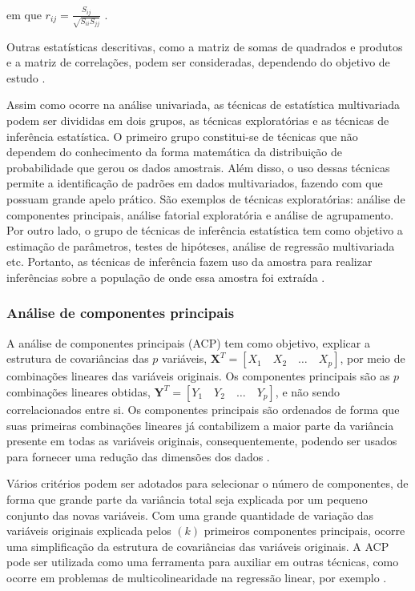 \documentclass[12pt,a4paper]{article}
\begin{document}
\noindent em que $r_{ij} = \frac{S_{ij}}{\sqrt{S_{ii} S_{jj}}}$ \cite{ferreira11}.  
	
\vspace{0.15cm} %
	
Outras estatísticas descritivas, como a matriz de somas de quadrados e produtos e a matriz de correlações, podem ser consideradas, dependendo do objetivo de estudo \cite{ferreira11}.
	
Assim como ocorre na análise univariada, as técnicas de estatística multivariada podem ser divididas em dois grupos, as técnicas exploratórias e as técnicas de inferência estatística. O primeiro grupo constitui-se de técnicas que não dependem do conhecimento da forma matemática da distribuição de probabilidade que gerou os dados amostrais. Além disso, o uso dessas técnicas permite a identificação de padrões em dados multivariados, fazendo com que possuam grande apelo prático. São exemplos de técnicas exploratórias: análise de componentes principais, análise fatorial exploratória e análise de agrupamento. Por outro lado, o grupo de técnicas de inferência estatística tem como objetivo a estimação de parâmetros, testes de hipóteses, análise de regressão multivariada etc.  Portanto, as técnicas de inferência fazem uso da amostra para realizar inferências sobre a população de onde essa amostra foi extraída \cite{mingoti10}.
	
\subsubsection{Análise de componentes principais} \label{ACP} 
	
A análise de componentes principais (ACP) tem como objetivo, explicar a estrutura de covariâncias das $p$ variáveis, $\boldsymbol{X}^T = [X_1 \quad X_2 \quad \dots \quad X_p]$, por meio de combinações lineares das variáveis originais. Os componentes principais são as $p$ combinações lineares obtidas, $\boldsymbol{Y}^T = [Y_1 \quad Y_2 \quad \dots \quad Y_p]$, e não sendo correlacionados entre si. Os componentes principais são ordenados de forma que suas primeiras combinações lineares já contabilizem a maior parte da variância presente em todas as variáveis originais, consequentemente, podendo ser usados para fornecer uma redução das dimensões dos dados \cite{mingoti10, everitt11}.
	
Vários critérios podem ser adotados para selecionar o número de componentes, de forma que grande parte da variância total seja explicada por um pequeno conjunto das novas variáveis. Com  uma grande quantidade de variação das variáveis originais explicada pelos $(k)$ primeiros componentes principais, ocorre uma simplificação da estrutura de covariâncias das variáveis originais. A ACP pode ser utilizada como uma ferramenta para auxiliar em outras técnicas, como ocorre em problemas de multicolinearidade na regressão linear, por exemplo \cite{ferreira11}.
	
\end{document}

